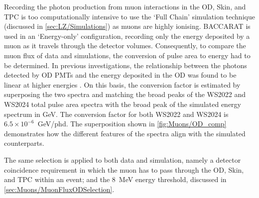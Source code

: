 Recording the photon production from muon interactions in the OD, Skin, and TPC is too computationally intensive to use the `Full Chain' simulation technique (discussed in \autoref{sec:LZ/Simulations}) as muons are highly ionising. BACCARAT is used in an `Energy-only' configuration, recording only the energy deposited by a muon as it travels through the detector volumes. Consequently, to compare the muon flux of data and simulations, the conversion of pulse area to energy had to be determined. In previous investigations, the relationship between the photons detected by OD PMTs and the energy deposited in the OD was found to be linear at higher energies \cite{edfraser:thesis}. On this basis, the conversion factor is estimated by superposing the two spectra and matching the broad peaks of the WS2022 and WS2024 total pulse area spectra with the broad peak of the simulated energy spectrum in GeV. The conversion factor for both WS2022 and WS2024 is $6.5\times10^{-6}$~GeV/phd. The superposition shown in \autoref{fig:Muons/OD_comp} demonstrates how the different features of the spectra align with the simulated counterparts.

The same selection is applied to both data and simulation, namely a detector coincidence requirement in which the muon has to pass through the OD, Skin, and TPC within an event; and the 8~MeV energy threshold, discussed in \autoref{sec:Muons/MuonFluxODSelection}.

